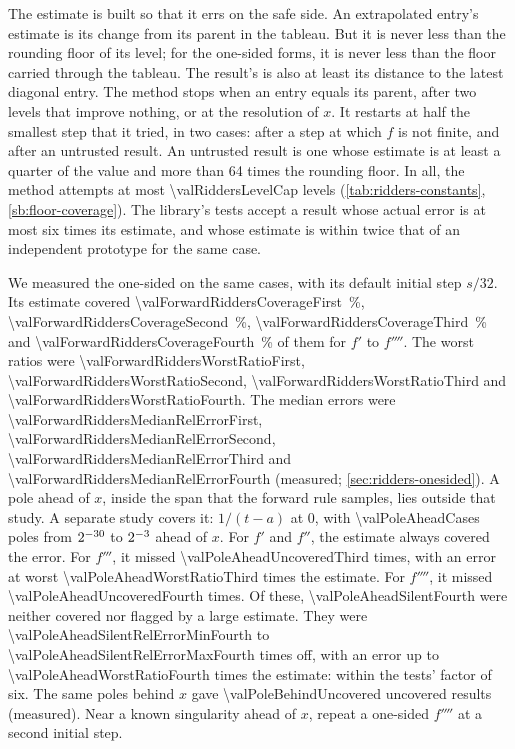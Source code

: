 The estimate is built so that it errs on the safe side. An extrapolated entry's estimate is its change from its parent
in the tableau. But it is never less than the rounding floor of its level; for the one-sided forms, it is never less
than the floor carried through the tableau. The result's  is also at least its distance to the latest
diagonal entry. The method stops when an entry equals its parent, after two levels that improve nothing, or at the
resolution of $x$. It restarts at half the smallest step that it tried, in two cases: after a step at which $f$ is not
finite, and after an untrusted result. An untrusted result is one whose estimate is at least a quarter of the value
and more than 64 times the rounding floor. In all, the method attempts at most \num{\valRiddersLevelCap} levels
(\cref{tab:ridders-constants}, \cref{sb:floor-coverage}). The library's tests accept a result whose actual error is at
most six times its estimate, and whose estimate is within twice that of an independent prototype for the same case.

We measured the one-sided  on the same cases, with its default initial step $s/32$. Its estimate
covered \SI{\valForwardRiddersCoverageFirst}{\percent}, \SI{\valForwardRiddersCoverageSecond}{\percent},
\SI{\valForwardRiddersCoverageThird}{\percent} and \SI{\valForwardRiddersCoverageFourth}{\percent} of them for $f'$
to $f''''$. The worst ratios were \num{\valForwardRiddersWorstRatioFirst}, \num{\valForwardRiddersWorstRatioSecond},
\num{\valForwardRiddersWorstRatioThird} and \num{\valForwardRiddersWorstRatioFourth}. The median errors were
\num{\valForwardRiddersMedianRelErrorFirst}, \num{\valForwardRiddersMedianRelErrorSecond},
\num{\valForwardRiddersMedianRelErrorThird} and \num{\valForwardRiddersMedianRelErrorFourth} (measured;
\cref{sec:ridders-onesided}). A pole ahead of $x$, inside the span that the forward rule samples, lies outside that
study. A separate study covers it: $1/(t - a)$ at 0, with \num{\valPoleAheadCases} poles from
$2^{-\num{30}}$ to $2^{-\num{3}}$ ahead of $x$. For $f'$ and
$f''$, the estimate always covered the error. For $f'''$, it missed \num{\valPoleAheadUncoveredThird} times, with an
error at worst \num{\valPoleAheadWorstRatioThird} times the estimate. For $f''''$, it missed
\num{\valPoleAheadUncoveredFourth} times. Of these, \num{\valPoleAheadSilentFourth} were neither covered nor flagged
by a large estimate. They were \num{\valPoleAheadSilentRelErrorMinFourth} to
\num{\valPoleAheadSilentRelErrorMaxFourth} times off, with an error up to \num{\valPoleAheadWorstRatioFourth} times
the estimate: within the tests' factor of six. The same poles behind $x$ gave \num{\valPoleBehindUncovered} uncovered
results (measured). Near a known singularity ahead of $x$, repeat a one-sided $f''''$ at a second initial step.

